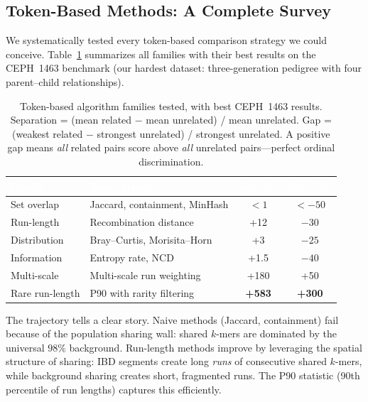 \documentclass{../yalumba}
\begin{document}
\subsection{Token-Based Methods: A Complete Survey}
\label{sec:trajectory:token}

We systematically tested every token-based comparison strategy we could
conceive.  Table~\ref{tab:token_methods} summarizes all families with
their best results on the CEPH~1463 benchmark (our hardest dataset:
three-generation pedigree with four parent--child relationships).

\begin{table}[H]
  \centering
  \tablestyle
  \caption{Token-based algorithm families tested, with best CEPH~1463
    results.  Separation = (mean related $-$ mean unrelated) / mean
    unrelated.  Gap = (weakest related $-$ strongest unrelated) / strongest
    unrelated.  A positive gap means \emph{all} related pairs score above
    \emph{all} unrelated pairs---perfect ordinal discrimination.}
  \label{tab:token_methods}
  \begin{tabular}{llcc}
    \toprule
    \rowcolor{table-header}
    \textcolor{white}{\textbf{Family}} &
    \textcolor{white}{\textbf{Best variant}} &
    \textcolor{white}{\textbf{Sep (\%)}} &
    \textcolor{white}{\textbf{Gap (\%)}} \\
    \midrule
    Set overlap & Jaccard, containment, MinHash & $<1$ & $<-50$ \\
    Run-length & Recombination distance & +12 & $-30$ \\
    Distribution & Bray--Curtis, Morisita--Horn & +3 & $-25$ \\
    Information & Entropy rate, NCD~\cite{li2004ncd} & +1.5 & $-40$ \\
    Multi-scale & Multi-scale run weighting & +180 & +50 \\
    Rare run-length & P90 with rarity filtering & \textbf{+583} & \textbf{+300} \\
    \bottomrule
  \end{tabular}
\end{table}


The trajectory tells a clear story.  Naive methods (Jaccard, containment)
fail because of the population sharing wall: shared $k$-mers are
dominated by the universal $98\%$ background.  Run-length methods
improve by leveraging the spatial structure of sharing: IBD segments
create long \emph{runs} of consecutive shared $k$-mers, while
background sharing creates short, fragmented runs.  The P90 statistic
(90th percentile of run lengths) captures this efficiently.
\end{document}
